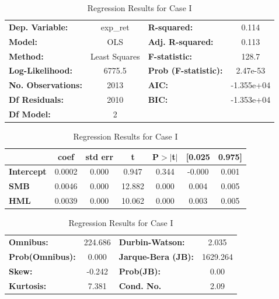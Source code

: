 \begin{table}
\center
\begin{tabular}{|lc|lc|}
\hline
\textbf{Dep. Variable:}    &     exp\_ret      & \textbf{  R-squared:         } &     0.114   \\
\textbf{Model:}            &       OLS        & \textbf{  Adj. R-squared:    } &     0.113   \\
\textbf{Method:}           &  Least Squares   & \textbf{  F-statistic:       } &     128.7   \\
\textbf{Log-Likelihood:    } &    6775.5 & \textbf{  Prob (F-statistic):} &  2.47e-53   \\
\textbf{No. Observations:} &        2013      & \textbf{  AIC:               } & -1.355e+04  \\
\textbf{Df Residuals:}     &        2010      & \textbf{  BIC:               } & -1.353e+04  \\
\textbf{Df Model:}         &           2      & \textbf{                     } &             \\
\hline
\end{tabular}

\bigskip

\begin{tabular}{|l|cccccc|}
\hline

                   & \textbf{coef} & \textbf{std err} & \textbf{t} & \textbf{P$>$$|$t$|$} & \textbf{[0.025} & \textbf{0.975]}  \\
\hline
\textbf{Intercept} &       0.0002  &        0.000     &     0.947  &         0.344        &       -0.000    &        0.001     \\
\textbf{SMB}       &       0.0046  &        0.000     &    12.882  &         0.000        &        0.004    &        0.005     \\
\textbf{HML}       &       0.0039  &        0.000     &    10.062  &         0.000        &        0.003    &        0.005     \\
\hline
\end{tabular}

\bigskip

\begin{tabular}{|lc|lc|}
\hline

\textbf{Omnibus:}       & 224.686 & \textbf{  Durbin-Watson:     } &    2.035  \\
\textbf{Prob(Omnibus):} &   0.000 & \textbf{  Jarque-Bera (JB):  } & 1629.264  \\
\textbf{Skew:}          &  -0.242 & \textbf{  Prob(JB):          } &     0.00  \\
\textbf{Kurtosis:}      &   7.381 & \textbf{  Cond. No.          } &     2.09  \\
\hline
\end{tabular}
\caption{Regression Results for Case I}
\label{table:lr_case1}
\end{table}



